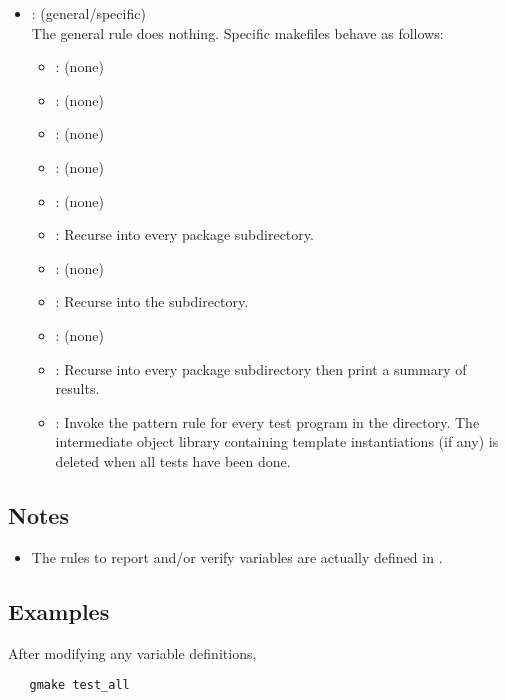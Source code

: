 \begin{itemize}
\item
    : (general/specific)
   \\ The general rule does nothing.  Specific makefiles behave as follows:
   \begin{itemize}
   \item
      : (none)
   \item
      : (none)
   \item
      : (none)
   \item
      : (none)
   \item
      : (none)
   \item
      : Recurse into every package subdirectory.
   \item
      : (none)
   \item
      : Recurse into the  subdirectory.
   \item
      : (none)
   \item
      : Recurse into every package subdirectory then print a summary
      of results.
   \item
      : Invoke the  pattern rule for every test
      program in the directory.  The intermediate object library containing
      template instantiations (if any) is deleted when all tests have been
      done.
   \end{itemize}
\end{itemize}

\subsection*{Notes}

\begin{itemize}
\item
   The rules to report and/or verify  variables are actually
   defined in .
\end{itemize}

\subsection*{Examples}

After modifying any  variable definitions, 

\begin{verbatim}
   gmake test_all
\end{verbatim}

